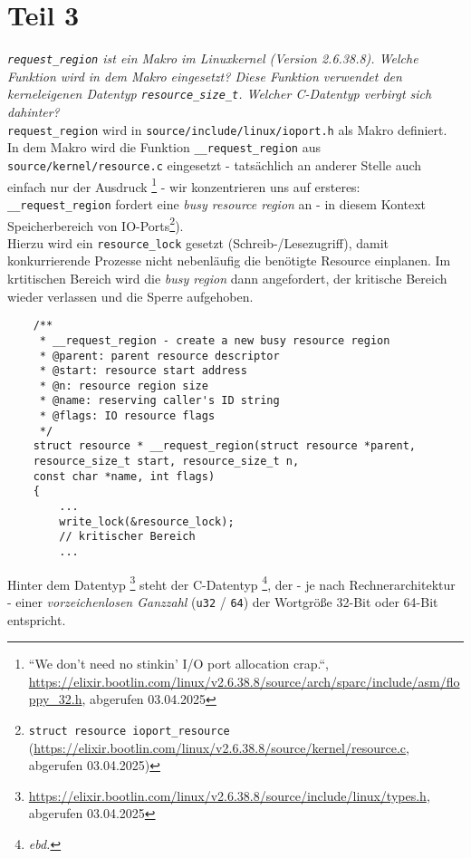 \section{Teil 3}

\textit{\texttt{request\_region} ist ein Makro im Linuxkernel (Version 2.6.38.8). Welche Funktion wird in dem Makro eingesetzt? Diese Funktion verwendet
den kerneleigenen Datentyp \texttt{resource\_size\_t}. Welcher C-Datentyp
verbirgt sich dahinter?}\\


\noindent
\texttt{request\_region} wird in \texttt{source/include/linux/ioport.h} als Makro definiert.\\
In dem Makro wird die Funktion \texttt{\_\_request\_region} aus \texttt{source/kernel/resource.c} eingesetzt - tatsächlich an anderer Stelle auch einfach nur der Ausdruck \footnote{
``We don't need no stinkin' I/O port allocation crap.``, \url{https://elixir.bootlin.com/linux/v2.6.38.8/source/arch/sparc/include/asm/floppy_32.h}, abgerufen 03.04.2025
} - wir konzentrieren uns auf ersteres:  \texttt{\_\_request\_region} fordert eine \textit{busy resource region} an - in diesem Kontext Speicherbereich von IO-Ports\footnote{
\texttt{struct resource ioport\_resource} (\url{https://elixir.bootlin.com/linux/v2.6.38.8/source/kernel/resource.c}, abgerufen 03.04.2025)
}).\\
Hierzu wird ein \texttt{resource\_lock} gesetzt (Schreib-/Lesezugriff), damit konkurrierende Prozesse nicht nebenläufig die benötigte Resource einplanen.
Im krtitischen Bereich wird die \textit{busy region} dann angefordert, der kritische Bereich wieder verlassen und die Sperre aufgehoben.

\begin{verbatim}
    /**
     * __request_region - create a new busy resource region
     * @parent: parent resource descriptor
     * @start: resource start address
     * @n: resource region size
     * @name: reserving caller's ID string
     * @flags: IO resource flags
     */
    struct resource * __request_region(struct resource *parent,
    resource_size_t start, resource_size_t n,
    const char *name, int flags)
    {
        ...
        write_lock(&resource_lock);
        // kritischer Bereich
        ...
\end{verbatim}

\noindent
Hinter dem Datentyp \footnote{
\url{https://elixir.bootlin.com/linux/v2.6.38.8/source/include/linux/types.h}, abgerufen 03.04.2025
} steht der C-Datentyp \footnote{\textit{ebd.}}, der - je nach Rechnerarchitektur - einer \textit{vorzeichenlosen Ganzzahl} (\texttt{u32} / \texttt{64}) der Wortgröße 32-Bit oder 64-Bit entspricht.

